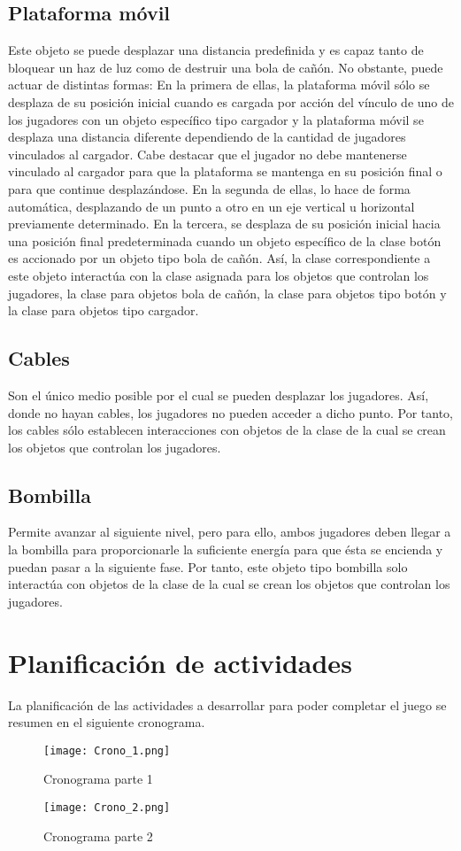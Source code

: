 \documentclass{article}
\begin{document}
\subsection{Plataforma móvil}
Este objeto se puede desplazar una distancia predefinida y es capaz tanto de bloquear un haz de luz como de destruir una bola de cañón. No obstante, puede actuar de distintas formas: 
En la primera de ellas, la plataforma móvil sólo se desplaza de su posición inicial cuando es cargada por acción del vínculo de uno de los jugadores con un objeto específico tipo cargador y la plataforma móvil se desplaza una distancia diferente dependiendo de la cantidad de jugadores vinculados al cargador. Cabe destacar que el jugador no debe mantenerse vinculado al cargador para que la plataforma se mantenga en su posición final o para que continue desplazándose.
En la segunda de ellas, lo hace de forma automática, desplazando de un punto a otro en un eje vertical u horizontal previamente determinado.
En la tercera, se desplaza de su posición inicial hacia una posición final predeterminada cuando un objeto específico de la clase botón es accionado por un objeto tipo bola de cañón.
Así, la clase correspondiente a este objeto interactúa con la clase asignada para los objetos que controlan los jugadores, la clase para objetos bola de cañón, la clase para objetos tipo botón y la clase para objetos tipo cargador.
\subsection{Cables}
Son el único medio posible por el cual se pueden desplazar los jugadores. Así, donde no hayan cables, los jugadores no pueden acceder a dicho punto. Por tanto, los cables sólo establecen interacciones con objetos de la clase de la cual se crean los objetos que controlan los jugadores.
\subsection{Bombilla}
Permite avanzar al siguiente nivel, pero para ello, ambos jugadores deben llegar a la bombilla para proporcionarle la suficiente energía para que ésta se encienda y puedan pasar a la siguiente fase. Por tanto, este objeto tipo bombilla solo interactúa con objetos de la clase de la cual se crean los objetos que controlan los jugadores.
\section{Planificación de actividades}
La planificación de las actividades a desarrollar para poder completar el juego se resumen en el siguiente cronograma.
\begin{figure}[h]
    \centering
    \texttt{[image: Crono\_1.png]}
    \caption{Cronograma parte 1}
    \label{fig:crono_1}
\end{figure}
\begin{figure}[h]
    \centering
    \texttt{[image: Crono\_2.png]}
    \caption{Cronograma parte 2}
    \label{fig:crono_2}
\end{figure}


\end{document}
